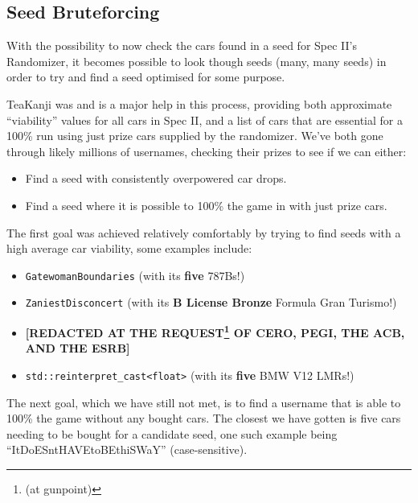 \documentclass[12pt,a4paper,notitlepage]{extarticle}
\begin{document}
        \subsection*{Seed Bruteforcing}
            With the possibility to now check the cars found in a seed for Spec II's
            Randomizer, it becomes possible to look though seeds (many, many seeds) in order
            to try and find a seed optimised for some purpose.

            TeaKanji was and is a major help in this process, providing both approximate
            ``viability'' values for all cars in Spec II, and a list of cars that are essential
            for a 100\% run using just prize cars supplied by the randomizer. We've both gone
            through likely millions of usernames, checking their prizes to see if we can either:

            \begin{itemize}
                \item Find a seed with consistently overpowered car drops.
                \item Find a seed where it is possible to 100\% the game in with just prize cars.
            \end{itemize}

            The first goal was achieved relatively comfortably by trying to find seeds with
            a high average car viability, some examples include:

            \begin{itemize}
                \item \texttt{GatewomanBoundaries} (with its \textbf{five} 787Bs!)
                \item \texttt{ZaniestDisconcert} (with its \textbf{B License Bronze} Formula
                Gran Turismo!)
                \item \textbf{[REDACTED AT THE REQUEST\footnote{(at gunpoint)} OF CERO, PEGI,
                THE ACB, AND THE ESRB]}
                \item \texttt{std::reinterpret\_cast<float>} (with its \textbf{five} BMW V12
                LMRs!)
            \end{itemize}

            The next goal, which we have still not met, is to find a username that is able to
            100\% the game without any bought cars. The closest we have gotten is five cars
            needing to be bought for a candidate seed, one such example being
            ``ItDoESn{\textquotesingle}tHAVEtoBEthiSWaY'' (case-sensitive).
\end{document}
